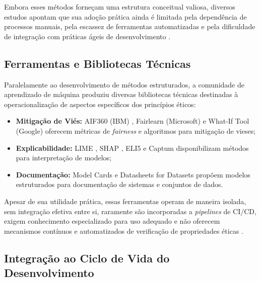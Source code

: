 Embora esses métodos forneçam uma estrutura conceitual valiosa, diversos estudos apontam que sua adoção prática ainda é limitada pela dependência de processos manuais, pela escassez de ferramentas automatizadas e pela dificuldade de integração com práticas ágeis de desenvolvimento \cite{McNamara2018, Morley2020, S001, S009, S028}.

\subsection{Ferramentas e Bibliotecas Técnicas}
\label{sec:ferramentas}

Paralelamente ao desenvolvimento de métodos estruturados, a comunidade de aprendizado de máquina produziu diversas bibliotecas técnicas destinadas à operacionalização de aspectos específicos dos princípios éticos:

\begin{itemize}
    \item \textbf{Mitigação de Viés:} AIF360 (IBM) \cite{Bellamy2019, S003}, Fairlearn (Microsoft) \cite{Bird2020, S030} e What-If Tool (Google) \cite{Wexler2020, S010} oferecem métricas de \textit{fairness} e algoritmos para mitigação de vieses;
    \item \textbf{Explicabilidade:} LIME \cite{Ribeiro2016}, SHAP \cite{Lundberg2017}, ELI5 e Captum disponibilizam métodos para interpretação de modelos;
    \item \textbf{Documentação:} Model Cards \cite{Mitchell2019} e Datasheets for Datasets \cite{Gebru2021} propõem modelos estruturados para documentação de sistemas e conjuntos de dados.
\end{itemize}

Apesar de sua utilidade prática, essas ferramentas operam de maneira isolada, sem integração efetiva entre si, raramente são incorporadas a \textit{pipelines} de CI/CD, exigem conhecimento especializado para uso adequado e não oferecem mecanismos contínuos e automatizados de verificação de propriedades éticas \cite{Holstein2019, S003, S015, S034}.

\subsection{Integração ao Ciclo de Vida do Desenvolvimento}
\label{sec:integracao-sdlc}


